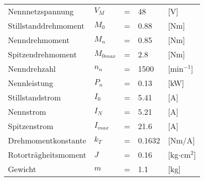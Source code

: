 \begin{tabular}{lllll}
Nennnetzspannung & $V_M$ & = & 48 & [V]\\
Stillstanddrehmoment & $M_0$ & = & 0.88 & [Nm]\\
Nenndrehmoment & $M_n$ & = & 0.85 & [Nm]\\
Spitzendrehmoment & $M_{0max}$ & = & 2.8 & [Nm]\\
Nenndrehzahl & $n_n$ & = & 1500 & [min$^{-1}$]\\
Nennleistung & $P_n$ & = & 0.13 & [kW]\\
Stillstandstrom & $I_0$ & = & 5.41 & [A]\\
Nennstrom & $I_N$ & = & 5.21 & [A]\\
Spitzenstrom & $I_{max}$ & = & 21.6 & [A]\\
Drehmomentkonstante & $k_T$ & = & 0.1632 & [Nm/A]\\
Rotorträgheitsmoment & $J$ & = & 0.16 & [kg$\cdot$cm$^2$]\\
Gewicht & $m$ & = & 1.1 & [kg]\\
\end{tabular}